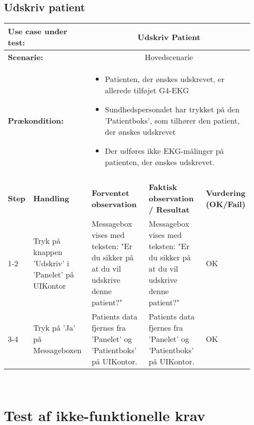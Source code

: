 \subsection{Udskriv patient}
\begin{tabular}{|p{1cm}|p{3cm}|p{4cm}|p{4cm}|p{2cm}|}
\hline
\multicolumn{2}{|p{4cm}|}{\textbf{Use case under test:}} & \multicolumn{3}{c|}{Udskriv Patient} \\\hline

\multicolumn{2}{|p{3cm}|}{\textbf{Scenarie:}} & \multicolumn{3}{c|}{Hovedscenarie} \\\hline

\multicolumn{2}{|p{3cm}|}{\textbf{Prækondition:}}  & \multicolumn{3}{l|}{\parbox{0.6\textwidth}{
\begin{itemize}[label=$\circ$]
\item Patienten, der ønskes udskrevet, er allerede tilføjet G4-EKG
\item Sundhedspersonalet har trykket på den 'Patientboks', som tilhører den patient, der ønskes udskrevet
\item Der udføres ikke EKG-målinger på patienten, der ønskes udskrevet.  
\end{itemize} }}\\\hline

\multicolumn{5}{|c|}{} \\\hline

\textbf{Step} & \textbf{Handling} & \textbf{Forventet observation} & \textbf{Faktisk observation / Resultat} & \textbf{Vurdering (OK/Fail)}\\\hline

1-2 & Tryk på knappen 'Udskriv' i 'Panelet' på UIKontor & Messagebox vises med teksten: "Er du sikker på at du vil udskrive denne patient?" & Messagebox vises med teksten: "Er du sikker på at du vil udskrive denne patient?" & OK \\\hline
3-4 & Tryk på 'Ja' på Messageboxen & Patients data fjernes fra 'Panelet' og 'Patientboks' på UIKontor. & Patients data fjernes fra 'Panelet' og 'Patientboks' på UIKontor. & OK \\\hline

\end{tabular}
\\

\section{Test af ikke-funktionelle krav}
